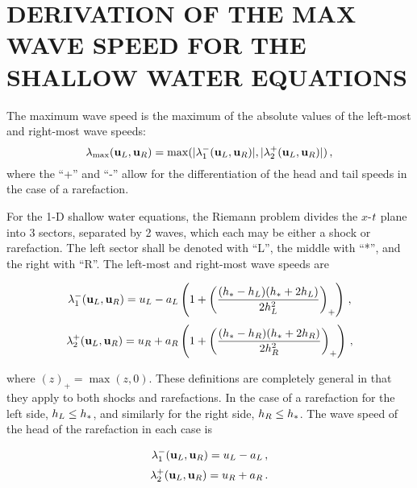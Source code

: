 \chapter{DERIVATION OF THE MAX WAVE SPEED FOR THE SHALLOW WATER EQUATIONS
\label{app:shallow_water_max_wave_speed}}

The maximum wave speed is the maximum of the absolute values of the
left-most and right-most wave speeds:
\begin{equation}
  \lambda_{\text{max}}(\mathbf{u}_L, \mathbf{u}_R)
  = \max(|\lambda_1^-(\mathbf{u}_L, \mathbf{u}_R)|
  ,|\lambda_2^+(\mathbf{u}_L, \mathbf{u}_R)|)
  \,,
\end{equation}
where the ``+'' and ``-'' allow for the differentiation of the head
and tail speeds in the case of a rarefaction.

For the 1-D shallow water equations, the Riemann problem divides the
$x$-$t$ plane into 3 sectors, separated by 2 waves, which
each may be either a shock or rarefaction. The left sector shall be
denoted with ``L'', the middle with ``*'', and the right with ``R''.
The left-most and right-most wave speeds are

\begin{equation}
  \lambda_1^-(\mathbf{u}_L, \mathbf{u}_R)
    = u_L - a_L\left(1 + \left(
    \frac{(h_* - h_L)(h_* + 2h_L)}{2h_L^2}\right)_+\right)
    \,,
\end{equation}
\begin{equation}
  \lambda_2^+(\mathbf{u}_L, \mathbf{u}_R)
    = u_R + a_R\left(1 + \left(
    \frac{(h_* - h_R)(h_* + 2h_R)}{2h_R^2}\right)_+\right)
    \,,
\end{equation}

where $(z)_+=\max(z,0)$. These definitions are completely general in that
they apply to both shocks and rarefactions. In the case of a rarefaction
for the left side, $h_L \leq h_*$, and similarly for the right
side, $h_R \leq h_*$. The wave speed of the head of the rarefaction
in each case is

\begin{equation}
  \lambda_1^-(\mathbf{u}_L, \mathbf{u}_R)
    = u_L - a_L
    \,,
\end{equation}
\begin{equation}
  \lambda_2^+(\mathbf{u}_L, \mathbf{u}_R)
    = u_R + a_R
    \,.
\end{equation}

